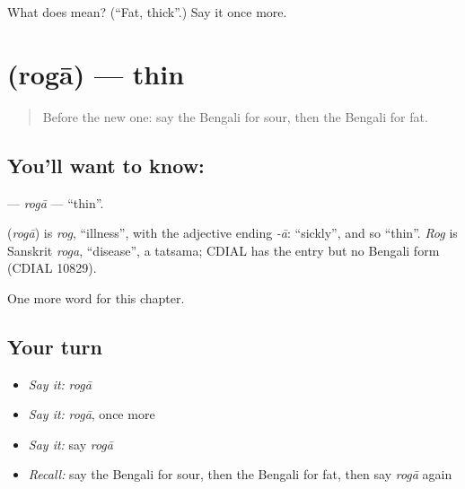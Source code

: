 \begin{tcolorbox}[breakable,colback=teal!4,colframe=teal!35!black,title={Before you move on}]
What does  mean? (\textquotedblleft{}Fat, thick\textquotedblright{}.) Say it once more.
\end{tcolorbox}
\section[\texorpdfstring{\bn{রোগা} (rogā)}{রোগা (rogā)}]{ (rogā) — thin}

\label{lesson:BN-C76-roga}



\begin{quote}
Before the new one: say the Bengali for sour, then the Bengali for fat.
\end{quote}

\subsection*{You'll want to know: }
\textbf{} — \emph{rogā} — \textquotedblleft{}thin\textquotedblright{}.

\begin{cousinweb}
\textbf{} (\emph{rogā}) is \emph{rog}, \textquotedblleft{}illness\textquotedblright{}, with the adjective ending \emph{-ā}: \textquotedblleft{}sickly\textquotedblright{}, and so \textquotedblleft{}thin\textquotedblright{}. \emph{Rog} is Sanskrit \emph{roga}, \textquotedblleft{}disease\textquotedblright{}, a tatsama; CDIAL has the entry but no Bengali form (CDIAL 10829).
\end{cousinweb}

\begin{grammarlens}[title={What you've built}]
One more word for this chapter.
\end{grammarlens}

\subsection*{Your turn}
\begin{itemize}
\raggedright
  \item \emph{Say it:} \emph{rogā}
  \item \emph{Say it:} \emph{rogā}, once more
  \item \emph{Say it:} say \emph{rogā}
  \item \emph{Recall:} say the Bengali for sour, then the Bengali for fat, then say \emph{rogā} again
\end{itemize}

